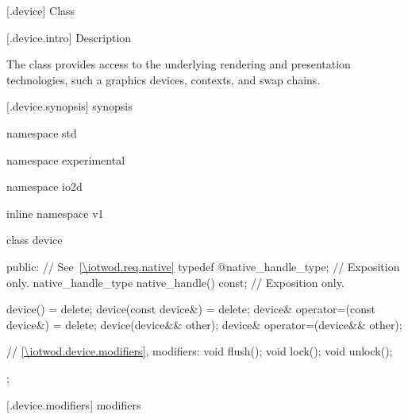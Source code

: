  [\iotwod.device] {Class }

 [\iotwod.device.intro] { Description}

\pnum
{}%
The  class provides access to the underlying rendering and 
presentation technologies, such a graphics devices, contexts, and swap chains.

 [\iotwod.device.synopsis] { synopsis}

\begin{codeblock}
namespace std { namespace experimental { namespace io2d { inline namespace v1 {
  class device {
  public:
    // See~\ref{\iotwod.req.native}
    typedef @\impdef@ native_handle_type; // Exposition only.
    native_handle_type native_handle() const; // Exposition only.

    device() = delete;
    device(const device&) = delete;
    device& operator=(const device&) = delete;
    device(device&& other);
    device& operator=(device&& other);

    // \ref{\iotwod.device.modifiers}, modifiers:
    void flush();
    void lock();
    void unlock();
  };
} } } }
\end{codeblock}

 [\iotwod.device.modifiers] { modifiers}

